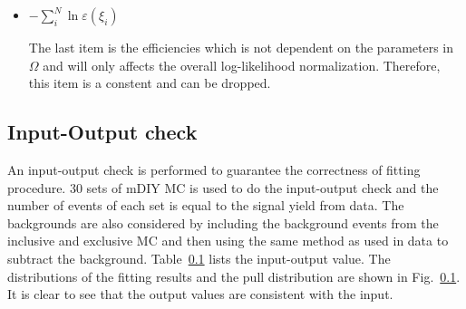 \begin{itemize}
		{\bf Comments on normalization factor}

	\item $- \sum_i^N \ln \varepsilon(\xi_i)$

	 	The last item is the efficiencies which is not dependent on the parameters
		in $\Omega$ and will only affects the overall log-likelihood normalization.
		Therefore, this item is a constent and can be dropped.


\end{itemize}

\subsection{Input-Output check}

An input-output check is performed to guarantee the correctness of fitting procedure. 
30 sets of mDIY MC is used to do the input-output check and the number of events of
each set is equal to the signal yield from data. The backgrounds are also considered
by including the background events from the inclusive and exclusive MC and then using 
the same method as used in data to subtract the background. Table~\ref{} lists the
input-output value. The distributions of the fitting results and the pull distribution
are shown in Fig.~\ref{}. It is clear to see that the output values are consistent with
the input.

